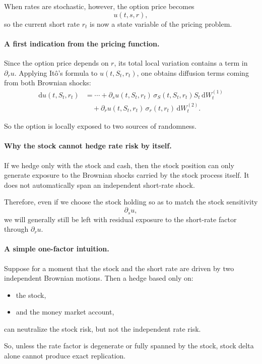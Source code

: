 \documentclass[11pt]{article}
\theoremstyle{plain}
\theoremstyle{definition}
\theoremstyle{remark}
\begin{document}
When rates are stochastic, however, the option price becomes
\[
u(t,s,r),
\]
so the current short rate \(r_t\) is now a state variable of the pricing
problem.

\paragraph{A first indication from the pricing function.}
Since the option price depends on \(r\), its total local variation
contains a term in \(\partial_r u\).
Applying It\^o's formula to \(u(t,S_t,r_t)\), one obtains diffusion
terms coming from both Brownian shocks:
\begin{align*}
\mathrm{d}u(t,S_t,r_t)
&=
\cdots
+
\partial_s u(t,S_t,r_t)\,\sigma_S(t,S_t,r_t)S_t\,\mathrm{d}W_t^{(1)}
\\
&\quad
+
\partial_r u(t,S_t,r_t)\,\sigma_r(t,r_t)\,\mathrm{d}W_t^{(2)}.
\end{align*}

So the option is locally exposed to two sources of randomness.

\paragraph{Why the stock cannot hedge rate risk by itself.}
If we hedge only with the stock and cash, then the stock position can
only generate exposure to the Brownian shocks carried by the stock
process itself.
It does not automatically span an independent short-rate shock.

Therefore, even if we choose the stock holding so as to match the stock
sensitivity
\[
\partial_s u,
\]
we will generally still be left with residual exposure to the short-rate
factor through \(\partial_r u\).

\paragraph{A simple one-factor intuition.}
Suppose for a moment that the stock and the short rate are driven by two
independent Brownian motions.
Then a hedge based only on:
\begin{itemize}[leftmargin=1.4em]
    \item the stock,
    \item and the money market account,
\end{itemize}
can neutralize the stock risk, but not the independent rate risk.

So, unless the rate factor is degenerate or fully spanned by the stock,
stock delta alone cannot produce exact replication.
\end{document}
